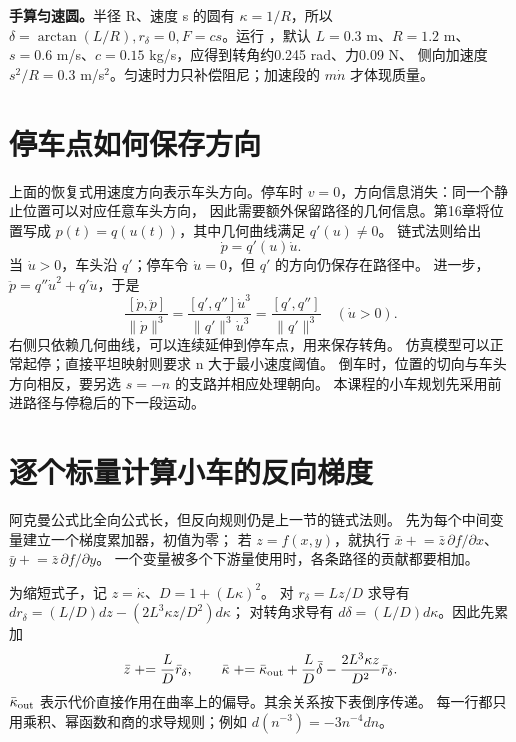\textbf{手算匀速圆。}半径 R、速度 s 的圆有 $\kappa=1/R$，所以
$\delta=\arctan(L/R),r_\delta=0,F=cs$。运行
，默认 $L=0.3$ m、$R=1.2$ m、
$s=0.6$ m/s、$c=0.15$ kg/s，应得到转角约0.245 rad、力0.09 N、
侧向加速度 $s^2/R=0.3$ m/s$^2$。匀速时力只补偿阻尼；加速段的 $m\dot n$ 才体现质量。

\section{停车点如何保存方向}
上面的恢复式用速度方向表示车头方向。停车时 $v=0$，方向信息消失：同一个静止位置可以对应任意车头方向，
因此需要额外保留路径的几何信息。第16章将位置写成 $p(t)=q(u(t))$，其中几何曲线满足 $q'(u)\ne0$。
链式法则给出
\begin{equation}
\dot p=q'(u)\dot u.
\end{equation}
当 $\dot u>0$，车头沿 $q'$；停车令 $\dot u=0$，但 $q'$ 的方向仍保存在路径中。
进一步，$\ddot p=q''\dot u^2+q'\ddot u$，于是
\begin{equation}
\frac{[\dot p,\ddot p]}{\|\dot p\|^3}
 =\frac{[q',q'']\dot u^3}{\|q'\|^3\dot u^3}
 =\frac{[q',q'']}{\|q'\|^3}\quad(\dot u>0).
\end{equation}
右侧只依赖几何曲线，可以连续延伸到停车点，用来保存转角。
仿真模型可以正常起停；直接平坦映射则要求 n 大于最小速度阈值。
倒车时，位置的切向与车头方向相反，要另选 $s=-n$ 的支路并相应处理朝向。
本课程的小车规划先采用前进路径与停稳后的下一段运动。

\section{逐个标量计算小车的反向梯度}
阿克曼公式比全向公式长，但反向规则仍是上一节的链式法则。
先为每个中间变量建立一个梯度累加器，初值为零；
若 $z=f(x,y)$，就执行 $\bar x\mathrel{+}=\bar z\,\partial f/\partial x$、
$\bar y\mathrel{+}=\bar z\,\partial f/\partial y$。
一个变量被多个下游量使用时，各条路径的贡献都要相加。

为缩短式子，记 $z=\dot\kappa$、$D=1+(L\kappa)^2$。
对 $r_\delta=Lz/D$ 求导有
$d r_\delta=(L/D)dz-(2L^3\kappa z/D^2)d\kappa$；
对转角求导有 $d\delta=(L/D)d\kappa$。因此先累加
\begin{equation}
\bar z\mathrel{+}=\frac L D\bar r_\delta,\qquad
\bar\kappa\mathrel{+}=\bar\kappa_{\rm out}+\frac L D\bar\delta
 -\frac{2L^3\kappa z}{D^2}\bar r_\delta.
\end{equation}
$\bar\kappa_{\rm out}$ 表示代价直接作用在曲率上的偏导。其余关系按下表倒序传递。
每一行都只用乘积、幂函数和商的求导规则；例如 $d(n^{-3})=-3n^{-4}dn$。

